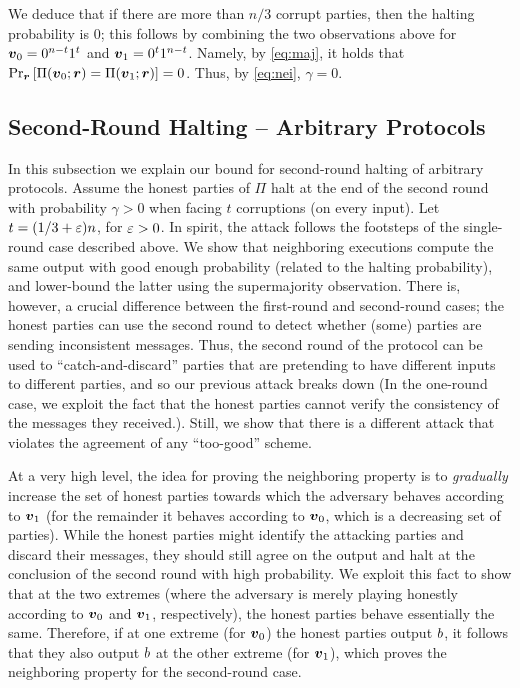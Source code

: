 We deduce that if there are more than $n/3$ corrupt parties, then the halting probability is $0$; this follows by combining the two observations above for ${ \boldsymbol{v}}_0=0^{n-t}1^{t}$ and ${ \boldsymbol{v}}_1=0^{t}1^{n-t}$. Namely, by \cref{eq:maj}, it holds that $\Pr_{{ \boldsymbol{r}}}\left[\Pi({ \boldsymbol{v}}_0;{ \boldsymbol{r}})=\Pi({ \boldsymbol{v}}_1;{ \boldsymbol{r}})\right]=0$. Thus,  by \cref{eq:nei}, $\gamma=0$.

\ifdefined\IsFullVersion\else
\vspace{-.2cm}
\fi
\subsection{Second-Round Halting -- Arbitrary Protocols}\label{sec:technique:2}

In this subsection we explain our bound for second-round halting of arbitrary protocols. Assume the honest parties of $\Pi$ halt at the end of the second round with probability $\gamma>0$ when facing $t$ corruptions (on every input). Let $t=(1/3+\varepsilon)n$, for $\varepsilon>0$. In spirit, the attack follows the footsteps of the single-round case described above. We show that neighboring executions compute the same output with good enough probability (related to the halting probability), and  lower-bound the latter using the supermajority observation. There is, however,  a crucial difference between the first-round and second-round cases; the honest parties can use the second round to detect whether (some) parties are sending inconsistent messages. Thus, the second round of the protocol can be used to ``catch-and-discard'' parties that are pretending to have different inputs to different parties, and so our previous attack breaks down (In the one-round case, we exploit the fact that the honest parties cannot verify the consistency of the messages they received.). Still, we show that there is a different attack that violates the agreement of any ``too-good'' scheme.

At a very high level, the idea  for proving the neighboring property is to \emph{gradually} increase  the set of honest parties towards which the adversary behaves according to ${ \boldsymbol{v}}_1$ (for the remainder it behaves according to ${ \boldsymbol{v}}_0$, which is a decreasing set of parties). While the honest parties might identify the attacking parties and discard their messages, they should still agree on the output and  halt at the conclusion of the second round with high probability. We exploit this fact to show that at the two extremes (where the adversary is merely playing honestly according to ${ \boldsymbol{v}}_0$ and ${ \boldsymbol{v}}_1$, respectively), the honest parties behave essentially the same. Therefore, if at one extreme (for ${ \boldsymbol{v}}_0$) the honest parties output $b$, it follows that they also output $b$ at the other extreme (for ${ \boldsymbol{v}}_1$), which proves the neighboring property for the second-round case.


